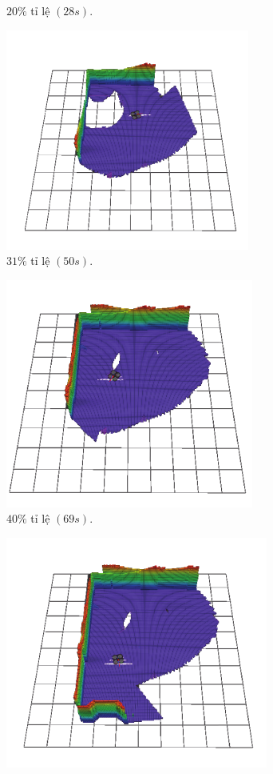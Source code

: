 \documentclass[11pt,openany]{book}
\begin{document}
\begin{algorimth}[H]
\begin{figure}[H]
\begin{subfigure}[H]{0.3\linewidth}
        \caption{{$20\%$ tỉ lệ $(28s).$}}
        \label{fig:3.13b}
    \end{subfigure}
    \begin{subfigure}[H]{0.3\linewidth}
        \centering
        \includegraphics[chiều rộng=\linewidth]{assets/3_13_c.png}
        \caption{{$31\%$ tỉ lệ $(50s).$}}
        \label{fig:3.13c}
    \end{subfigure}
    \begin{subfigure}[H]{0.3\linewidth}
        \centering
        \includegraphics[chiều rộng=\linewidth]{assets/3_13_d.png}
        \caption{{$40\%$ tỉ lệ $(69s).$}}
        \label{fig:3.13d}
    \end{subfigure}
    \begin{subfigure}[H]{0.3\linewidth}
        \centering
        \includegraphics[chiều rộng=\linewidth]{assets/3_13_e.png}

\end{subfigure}
\end{figure}
\end{algorimth}
\end{document}
